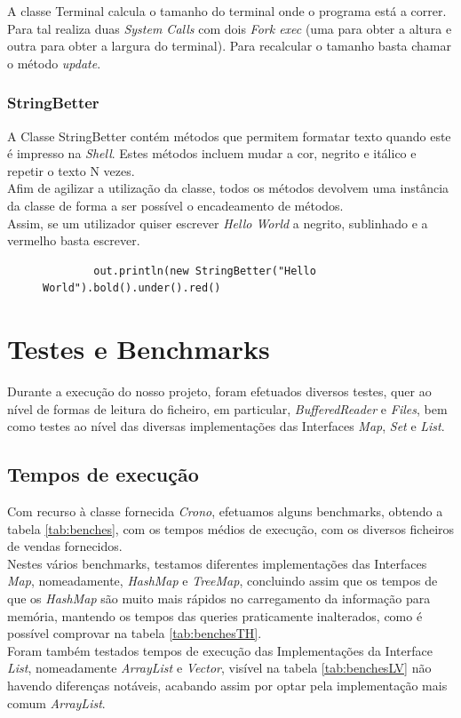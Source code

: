 \documentclass[a4paper]{report}
\begin{document}
A classe Terminal calcula o tamanho do terminal onde o programa está a correr.
Para tal realiza duas \textit{System Calls} com dois \textit{Fork exec} (uma para obter a altura
e outra para obter a largura do terminal).
Para recalcular o tamanho basta chamar o método \textit{update}.

\subsection{StringBetter}

A Classe StringBetter contém métodos que permitem formatar texto quando este é impresso na
\textit{Shell}. Estes métodos incluem mudar a cor, negrito e itálico e repetir o texto N vezes.\\
Afim de agilizar a utilização da classe, todos os métodos devolvem uma instância da classe
de forma a ser possível o encadeamento de métodos.\\
Assim, se um utilizador quiser escrever \textit{Hello World} a negrito, sublinhado e a
vermelho basta escrever.
\begin{figure}[H]
    \begin{center}
        \begin{verbatim}
        out.println(new StringBetter("Hello World").bold().under().red()
        \end{verbatim}
    \end{center}
\end{figure}

\chapter{Testes e Benchmarks}

Durante a execução do nosso projeto, foram efetuados diversos testes, quer ao nível
de formas de leitura do ficheiro, em particular, \textit{BufferedReader} e \textit{Files},
bem como testes ao nível das diversas implementações das Interfaces \textit{Map},
\textit{Set} e \textit{List}.

\section{Tempos de execução}

Com recurso à classe fornecida \textit{Crono}, efetuamos alguns benchmarks, obtendo
a tabela \ref{tab:benches}, com os tempos médios de execução, com os diversos ficheiros
de vendas fornecidos.\\
Nestes vários benchmarks, testamos diferentes implementações das Interfaces \textit{Map},
nomeadamente, \textit{HashMap} e \textit{TreeMap}, concluindo assim que os tempos de 
que os \textit{HashMap} são muito mais rápidos no carregamento da informação para 
memória, mantendo os tempos das queries praticamente inalterados, como é possível
comprovar na tabela \ref{tab:benchesTH}.\\
Foram também testados tempos de execução das Implementações da Interface \textit{List},
nomeadamente \textit{ArrayList} e \textit{Vector}, visível na tabela \ref{tab:benchesLV}
não havendo diferenças notáveis, acabando assim por optar pela implementação 
mais comum \textit{ArrayList}.
\end{document}
